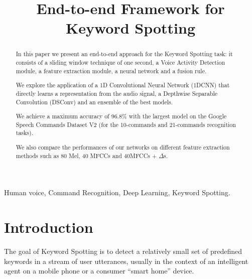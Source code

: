 \documentclass[conference]{IEEEtran}
\begin{document}
\title{End-to-end Framework for Keyword Spotting}
\author{
\and
{}
}

\maketitle

\begin{abstract}
In this paper we present an end-to-end approach for the Keyword Spotting task: it consists of a sliding window technique of one second, a Voice Activity Detection module, a feature extraction module, a neural network and a fusion rule.

We explore the application of a 1D Convolutional Neural Network (1DCNN) that directly learns a representation from the audio signal, a Depthwise Separable Convolution (DSConv) and an ensemble of the best models.

We achieve a maximum accuracy of 96.8\% with the largest model on the Google Speech Commands Dataset V2 (for the 10-commands and 21-commands recognition tasks).

We also compare the performances of our networks on different feature extraction methods such as 80 Mel, 40 MFCCs and 40MFCCs + $\Delta$s.
\end{abstract}

\IEEEpeerreviewmaketitle
\begin{IEEEkeywords}
Human voice, Command Recognition, Deep Learning, Keyword Spotting.
\end{IEEEkeywords}

\section{Introduction}
The goal of Keyword Spotting is to detect a relatively small set of predefined keywords in a stream of user utterances, usually in the context of an intelligent agent on a mobile phone or a consumer “smart home” device.
\end{document}
